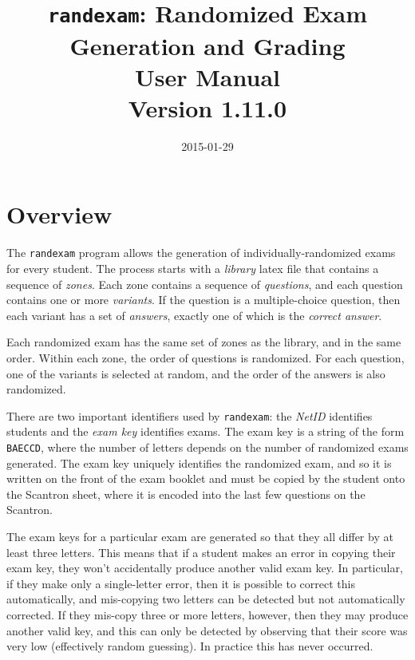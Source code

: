 \documentclass{article}
\begin{document}
\title{\texttt{randexam}: Randomized Exam Generation and Grading\\[1em] User Manual\\[1em] \Large Version 1.11.0}
\date{\vspace*{-2em}2015-01-29}
\maketitle

\section{Overview}

The \texttt{randexam} program allows the generation of
individually-randomized exams for every student. The process starts
with a \emph{library} latex file that contains a sequence of
\emph{zones}. Each zone contains a sequence of \emph{questions}, and
each question contains one or more \emph{variants}. If the question is
a multiple-choice question, then each variant has a set of
\emph{answers}, exactly one of which is the \emph{correct answer}.

Each randomized exam has the same set of zones as the library, and in
the same order. Within each zone, the order of questions is
randomized. For each question, one of the variants is selected at
random, and the order of the answers is also randomized.

There are two important identifiers used by \texttt{randexam}: the
\emph{NetID} identifies students and the \emph{exam key} identifies
exams. The exam key is a string of the form \texttt{BAECCD}, where the
number of letters depends on the number of randomized exams
generated. The exam key uniquely identifies the randomized exam, and
so it is written on the front of the exam booklet and must be copied
by the student onto the Scantron sheet, where it is encoded into the
last few questions on the Scantron.

The exam keys for a particular exam are generated so that they all
differ by at least three letters. This means that if a student makes
an error in copying their exam key, they won't accidentally produce
another valid exam key. In particular, if they make only a
single-letter error, then it is possible to correct this
automatically, and mis-copying two letters can be detected but not
automatically corrected. If they mis-copy three or more letters,
however, then they may produce another valid key, and this can only be
detected by observing that their score was very low (effectively
random guessing). In practice this has never occurred.
\end{document}
